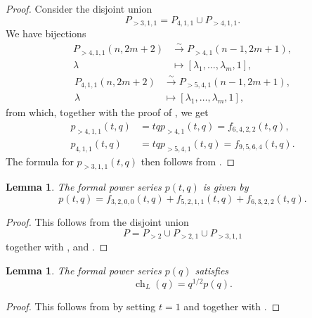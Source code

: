 \documentclass[a4paper, 12pt, reqno]{amsart}
\newtheorem{lemma}[theorem]{Lemma}
\theoremstyle{remark}
\numberwithin{equation}{subsection}
\DeclareMathOperator{\ch}{ch}
\begin{document}
\begin{proof}
  Consider the disjoint union
  \begin{equation*}
    P_{>3, 1, 1} = P_{4, 1, 1} \cup P_{>4, 1, 1}.
  \end{equation*}
  We have bijections
  \begin{align*}
    P_{>4, 1, 1}(n, 2m + 2) &\xrightarrow{\sim} P_{>4, 1}(n - 1, 2m + 1), \\
    \lambda &\mapsto [\lambda_1, \dots, \lambda_m, 1],
  \end{align*}
  \begin{align*}
    P_{4, 1, 1}(n, 2m + 2) &\xrightarrow{\sim} P_{>5, 4, 1}(n - 1, 2m + 1), \\
    \lambda &\mapsto [\lambda_1, \dots, \lambda_m, 1],
  \end{align*}
  from which, together with the proof of , we get
  \begin{align*}
    p_{>4, 1, 1}(t, q) &= tqp_{>4, 1}(t, q) = f_{6, 4, 2, 2}(t, q), \\
    p_{4, 1, 1}(t, q) &= tqp_{>5, 4, 1}(t, q) = f_{9, 5, 6, 4}(t, q).
  \end{align*}
  The formula for $p_{>3, 1, 1}(t, q)$ then follows from .
\end{proof}

\begin{lemma}
  \label{lmm:29}
  The formal power series $p(t, q)$ is given by
  \begin{equation*}
    p(t, q) = f_{3, 2, 0, 0}(t, q) + f_{5, 2, 1, 1}(t, q) + f_{6, 3, 2, 2}(t, q).
  \end{equation*}
\end{lemma}

\begin{proof}
  This follows from the disjoint union
  \begin{equation*}
    P = P_{>2} \cup P_{>2, 1} \cup P_{>3, 1, 1}
  \end{equation*}
  together with ,  and .
\end{proof}

\begin{lemma}
  \label{lmm:30}
  The formal power series $p(q)$ satisfies
  \begin{equation*}
    \ch_{L}(q) = q^{1/2}p(q).
  \end{equation*}
\end{lemma}

\begin{proof}
  This follows from  by setting $t = 1$ and \cite[Theorem 4]{andrews_singular_2022} together with .
\end{proof}
\end{document}
